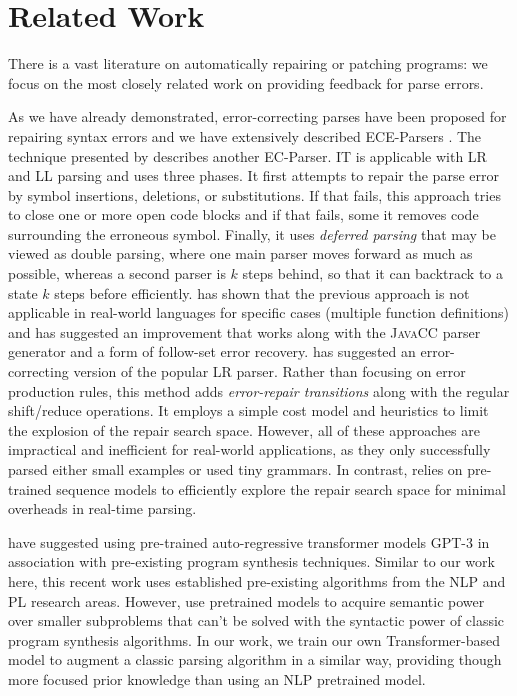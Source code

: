\section{Related Work}
\label{sec:related-work}

There is a vast literature on automatically repairing or patching programs:
we focus on the most closely related work on providing feedback for parse
errors.

%
As we have already demonstrated, error-correcting parses have been proposed for
repairing syntax errors and we have extensively described ECE-Parsers
\citep{Aho_1972}. The technique presented by \citep{Burke1987} describes another
EC-Parser. IT is applicable with LR and LL parsing and uses three phases. It
first attempts to repair the parse error by symbol insertions, deletions, or
substitutions. If that fails, this approach tries to close one or more open code
blocks and if that fails, some it removes code surrounding the erroneous symbol.
Finally, it uses \emph{deferred parsing} that may be viewed as double parsing,
where one main parser moves forward as much as possible, whereas a second parser
is $k$ steps behind, so that it can backtrack to a state $k$ steps before
efficiently. \citep{VanDerSpek_2005} has shown that the previous approach is not
applicable in real-world languages for specific cases (\eg multiple function
definitions) and has suggested an improvement that works along with the
\textsc{JavaCC} parser generator and a form of follow-set error recovery.
\citep{Corchuelo2002} has suggested an error-correcting version of the popular
LR parser. Rather than focusing on error production rules, this method adds
\emph{error-repair transitions} along with the regular shift/reduce operations.
It employs a simple cost model and heuristics to limit the explosion of the
repair search space. However, all of these approaches are impractical and
inefficient for real-world applications, as they only successfully parsed either
small examples or used tiny grammars. In contrast, \toolname relies on
pre-trained sequence models to efficiently explore the repair search space for
minimal overheads in real-time parsing.

%
\citep{Rahmani2021, Verbruggen2021} have suggested using pre-trained
auto-regressive transformer models \ie \textsc{GPT-3} \citep{GPT2020} in
association with pre-existing program synthesis techniques. Similar to our work
here, this recent work uses established pre-existing algorithms from the NLP and
PL research areas. However, \citep{Rahmani2021, Verbruggen2021} use pretrained
models to acquire semantic power over smaller subproblems that can't be solved
with the syntactic power of classic program synthesis algorithms. In our work,
we train our own Transformer-based model to augment a classic parsing algorithm
in a similar way, providing though more focused prior knowledge than using an
NLP pretrained model.

